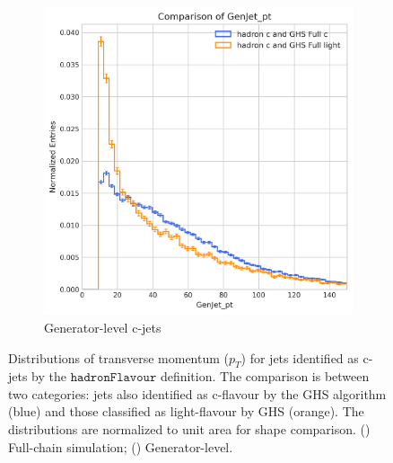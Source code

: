 \documentclass[10pt,twocolumn]{article}
\newcommand*{\hadFlav}{\texttt{hadronFlavour}}
\begin{document}
\begin{figure}[!htbp]
\begin{subfigure}[t]{0.48\textwidth}
        \includegraphics[width=\textwidth]{images/compare_GenJet_pt_GHSFull_light_vs_c_filter_hadronFlavour_4.png}
        \caption{Generator-level c-jets}
        \label{fig:pt_c_hadron_gen}
    \end{subfigure}
    \caption{Distributions of transverse momentum ($p_T$) for jets identified as c-jets by the $\hadFlav$ definition. The comparison is between two categories: jets also identified as c-flavour by the GHS algorithm (blue) and those classified as light-flavour by GHS (orange). The distributions are normalized to unit area for shape comparison. () Full-chain simulation; () Generator-level.}
    \label{fig:pt_c_hadron_combined}
\end{figure}
\end{document}
